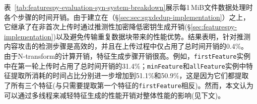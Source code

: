 \begin{table}[!htb]
    \small
    \centering
    \setlength{\tabcolsep}{5pt}
    \renewcommand{\arraystretch}{1.05}
    \caption{(Exp\#5)每处理1\,MiB数据时各步骤的时间开销(单位：ms)。除括号中明确指出外，第二轮上传的每一步骤所消耗的时间与第一轮上传的相同。}
    \label{tab:featurespy-evaluation-syn-system-breakdown}
\end{table}

表~\ref{tab:featurespy-evaluation-syn-system-breakdown}展示每1\,MiB文件数据处理时各个步骤的时间开销。由于\prototype 建立在\sysnameS（\S\ref{sec:sec:sgxdedup-implementation}）之上，它继承了在非首次上传时通过推测性加密降低密钥生成开销(\S\ref{sec:featurespy-implementation})以及避免传输重复数据块带来的性能优势。结果表明，针对推测内容攻击的检测步骤是高效的，并且在上传过程中仅占用了总时间开销的0.4\%。由于N-transform的计算开销，特征生成步骤开销很高。例如，{\tt firstFeature}实例中在第一轮上传时占用了总时间开销的31.4\%；{\tt minFeature}和{\tt allFeature}实例中特征提取所消耗的时间占比分别进一步增加到51.1\%和50.9\%，这是因为它们都提取了所有三个特征(与只需要提取第一个特征的{\tt firstFeature}相反)。然而，本文认为可以通过多线程来减轻特征生成的性能开销对\prototype 整体性能的影响(见下文)。

